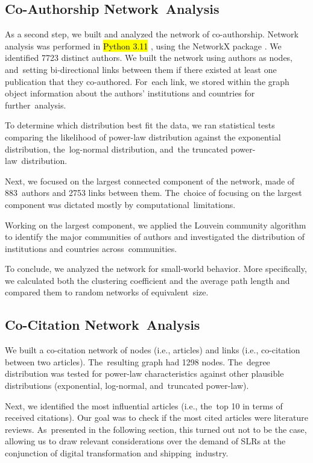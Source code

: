 \documentclass[jmse,review,accept,pdftex,moreauthors]{Definitions/mdpi}
\begin{document}
\subsection{Co-Authorship Network~Analysis}
As a second step, we built and analyzed the network of co-authorship. Network analysis was performed in \hl{Python 3.11}%
, using the NetworkX package \citep{hagberg2008exploring}. We identified 7723 distinct authors. We built the network using authors as nodes, and~setting bi-directional links between them if there existed at least one publication that they co-authored. For~each link, we stored within the graph object information about the authors' institutions and countries for further~analysis.

To determine which distribution best fit the data, we ran statistical tests comparing the likelihood of power-law distribution against the exponential distribution, the~log-normal distribution, and~the truncated power-law~distribution.

Next, we focused on the largest connected component of the network, made of 883~authors and 2753 links between them. The~choice of focusing on the largest component was dictated mostly by computational~limitations.

Working on the largest component, we applied the Louvein community \citep{blondel2008fast} algorithm to identify the major communities of authors and investigated the distribution of institutions and countries across~communities.

To conclude, we analyzed the network for small-world behavior. More specifically, we calculated both the clustering coefficient and the average path length and compared them to random networks of equivalent~size.

\subsection{Co-Citation Network~Analysis}
We built a co-citation network of nodes (i.e., articles) and links (i.e., co-citation between two articles). The~resulting graph had 1298 nodes. The~degree distribution was tested for power-law characteristics against other plausible distributions (exponential, log-normal, and~truncated power-law).

Next, we identified the most influential articles (i.e., the~top 10 in terms of received citations). Our goal was to check if the most cited articles were literature reviews. As~presented in the following section, this turned out not to be the case, allowing us to draw relevant considerations over the demand of SLRs at the conjunction of digital transformation and shipping~industry.
\end{document}
